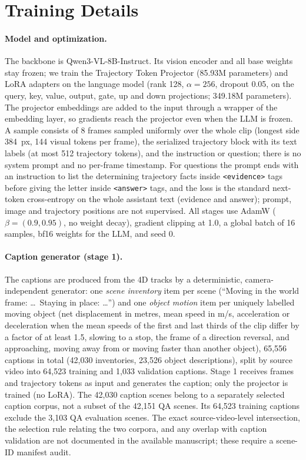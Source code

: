 \section{Training Details}
\label{app:training}

\paragraph{Model and optimization.}
The backbone is Qwen3-VL-8B-Instruct.
Its vision encoder and all base weights stay frozen; we train the Trajectory Token Projector (85.93M parameters) and LoRA adapters on the language model (rank 128, $\alpha=256$, dropout 0.05, on the query, key, value, output, gate, up and down projections; 349.18M parameters).
The projector embeddings are added to the input through a wrapper of the embedding layer, so gradients reach the projector even when the LLM is frozen.
A sample consists of 8 frames sampled uniformly over the whole clip (longest side 384~px, 144 visual tokens per frame), the serialized trajectory block with its text labels (at most 512 trajectory tokens), and the instruction or question; there is no system prompt and no per-frame timestamp.
For questions the prompt ends with an instruction to list the determining trajectory facts inside \texttt{<evidence>} tags before giving the letter inside \texttt{<answer>} tags, and the loss is the standard next-token cross-entropy on the whole assistant text (evidence and answer); prompt, image and trajectory positions are not supervised.
All stages use AdamW ($\beta=(0.9,0.95)$, no weight decay), gradient clipping at 1.0, a global batch of 16 samples, bf16 weights for the LLM, and seed 0.

\paragraph{Caption generator (stage 1).}
The captions are produced from the 4D tracks by a deterministic, camera-independent generator: one \emph{scene inventory} item per scene (``Moving in the world frame: \ldots\ Staying in place: \ldots'') and one \emph{object motion} item per uniquely labelled moving object (net displacement in metres, mean speed in m/s, acceleration or deceleration when the mean speeds of the first and last thirds of the clip differ by a factor of at least 1.5, slowing to a stop, the frame of a direction reversal, and approaching, moving away from or moving faster than another object), 65,556 captions in total (42,030 inventories, 23,526 object descriptions), split by source video into 64,523 training and 1,033 validation captions.
Stage 1 receives frames and trajectory tokens as input and generates the caption; only the projector is trained (no LoRA). The 42,030 caption scenes belong to a separately selected caption corpus, not a subset of the 42,151 QA scenes. Its 64,523 training captions exclude the 3,103 QA evaluation scenes. The exact source-video-level intersection, the selection rule relating the two corpora, and any overlap with caption validation are not documented in the available manuscript; these require a scene-ID manifest audit.

